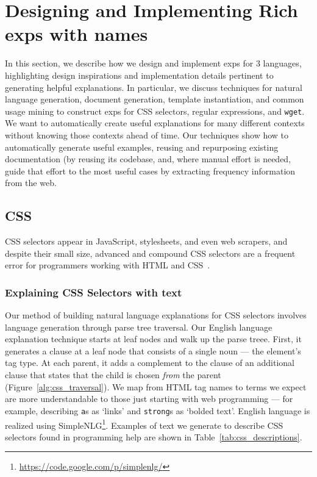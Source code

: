 \section{Designing and Implementing Rich \Glspl{exp} with \Glspl{name}}

In this section, we describe how we design and implement \glspl{exp} for 3 languages, highlighting design inspirations and implementation details pertinent to generating helpful explanations.
In particular, we discuss techniques for natural language generation, document generation, template instantiation, and common usage mining to construct \glspl{exp} for CSS selectors, regular expressions, and \texttt{wget}.
We want to automatically create useful explanations for many different contexts without knowing those contexts ahead of time. 
Our techniques show how to automatically generate useful examples, reusing and repurposing existing documentation (by reusing its codebase, and, where manual effort is needed, guide that effort to the most useful cases by extracting frequency information from the web.

\subsection{CSS}

CSS selectors appear in JavaScript, stylesheets, and even web scrapers, and despite their small size, advanced and compound CSS selectors are a frequent error for programmers working with HTML and CSS~\cite{park_towards_2013}.

\subsubsection{Explaining CSS Selectors with text}

Our method of building natural language explanations for CSS selectors involves language generation through parse tree traversal.
Our English language explanation technique starts at leaf nodes and walk up the parse treee.
First, it generates a clause at a leaf node that consists of a single noun --- the element's tag type.
At each parent, it adds a complement to the clause of an additional clause that states that the child is chosen \emph{from} the parent (Figure~\ref{alg:css_traversal}).
We map from HTML tag names to terms we expect are more understandable to those just starting with web programming --- for example, describing \texttt{a}s as `links' and \texttt{strong}s as `bolded text'. 
English language is realized using SimpleNLG\footnote{\url{https://code.google.com/p/simplenlg/}}.
Examples of text we generate to describe CSS selectors found in programming help are shown in Table~\ref{tab:css_descriptions}.

